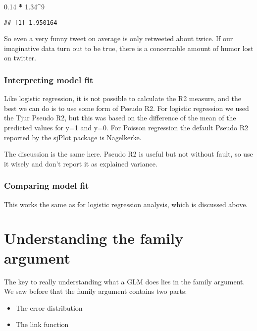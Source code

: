 \documentclass[
]{article}
\newenvironment{Shaded}{\begin{snugshade}}{\end{snugshade}}
\newcommand{\DecValTok}[1]{\textcolor[rgb]{0.00,0.00,0.81}{#1}}
\newcommand{\FloatTok}[1]{\textcolor[rgb]{0.00,0.00,0.81}{#1}}
\newcommand{\OperatorTok}[1]{\textcolor[rgb]{0.81,0.36,0.00}{\textbf{#1}}}
\newcommand{\StringTok}[1]{\textcolor[rgb]{0.31,0.60,0.02}{#1}}
\providecommand{\tightlist}{%
  \setlength{\itemsep}{0pt}\setlength{\parskip}{0pt}}
\begin{document}
\begin{Shaded}
\begin{Highlighting}[]
\FloatTok{0.14} \OperatorTok{*}\StringTok{ }\FloatTok{1.34}\OperatorTok{^}\DecValTok{9}
\end{Highlighting}
\end{Shaded}

\begin{verbatim}
## [1] 1.950164
\end{verbatim}

So even a very funny tweet on average is only retweeted about twice. If
our imaginative data turn out to be true, there is a concernable amount
of humor lost on twitter.

\hypertarget{interpreting-model-fit-1}{%
\subsubsection{Interpreting model fit}\label{interpreting-model-fit-1}}

Like logistic regression, it is not possible to calculate the R2
measure, and the best we can do is to use some form of Pseudo R2. For
logistic regression we used the Tjur Pseudo R2, but this was based on
the difference of the mean of the predicted values for y=1 and y=0. For
Poisson regression the default Pseudo R2 reported by the sjPlot package
is Nagelkerke.

The discussion is the same here. Pseudo R2 is useful but not without
fault, so use it wisely and don't report it as explained variance.

\hypertarget{comparing-model-fit}{%
\subsubsection{Comparing model fit}\label{comparing-model-fit}}

This works the same as for logistic regression analysis, which is
discussed above.

\hypertarget{understanding-the-family-argument}{%
\section{Understanding the family
argument}\label{understanding-the-family-argument}}

The key to really understanding what a GLM does lies in the family
argument. We saw before that the family argument contains two parts:

\begin{itemize}
\tightlist
\item
  The error distribution
\item
  The link function
\end{itemize}
\end{document}

